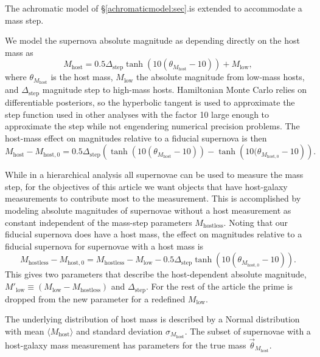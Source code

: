 \documentclass{aastex61}   	%
\begin{document}
The achromatic model of \S\ref{achromaticmodel:sec}.is extended to accommodate a mass step.

We model the supernova absolute magnitude as depending directly on the host mass  as
\begin{equation}
M_{\mathrm{host}} = 0.5\Delta_{\mathrm{step}} \tanh{\left(10(\theta_{M_{\text{host}}}-10)\right)} + M_{\mathrm{low}},
\end{equation}
where $\theta_{M_{\text{host}}}$ is the host mass,  $M_{\mathrm{low}}$ the  
absolute magnitude from low-mass hosts, and $\Delta_{\mathrm{step}}$  magnitude step to high-mass hosts.  Hamiltonian
Monte Carlo relies on differentiable posteriors, so the hyperbolic tangent is used to approximate the step function used in other analyses
with the factor 10 large enough to approximate the step while not engendering numerical precision problems.
The host-mass effect on magnitudes relative to a fiducial supernova is then
\begin{equation}
M_{\mathrm{host}} - M_{\mathrm{host},0}= 0.5\Delta_{\mathrm{step}}
\left(
\tanh{\left(10(\theta_{M_{\text{host}}}-10)\right)} -
\tanh{\left(10(\theta_{M_{\mathrm{host},0}}-10\right)}
\right).
\label{step:eqn}
\end{equation}

While in a hierarchical analysis all supernovae can be used to measure the mass step, for the objectives of this article we want
objects that have host-galaxy measurements to contribute most to the measurement.  This is accomplished by
modeling absolute magnitudes of supernovae without a host measurement as constant independent
of the mass-step parameters
$M_{\mathrm{hostless}}$.  Noting that our fiducial supernova does have a host mass, the effect on magnitudes relative to a fiducial supernova 
for supernovae with a host mass is
\begin{equation}
M_{\mathrm{hostless}} - M_{\mathrm{host},0}= M_{\mathrm{hostless}} - M_{\mathrm{low}} - 0.5\Delta_{\mathrm{step}}
\tanh{\left(10(\theta_{M_{\text{host},0}}-10)\right)} .
\label{step:eqn}
\end{equation}
This gives two parameters that describe the host-dependent absolute magnitude, $M'_{\mathrm{low}} \equiv (M_{\mathrm{low}} - M_{\mathrm{hostless}})$ and $\Delta_{\mathrm{step}}$.  For the rest of the article the prime is dropped from the new parameter for a redefined  $M_{\mathrm{low}}$.

The underlying distribution of host mass is described by a Normal distribution with mean
$\langle M_{\text{host}} \rangle$ and standard deviation
$\sigma_{M_{\text{host}}}$.
The subset of supernovae with a host-galaxy mass measurement has parameters for the true mass $\vec{\theta}_{M_{\text{host}}}$.
\end{document}
